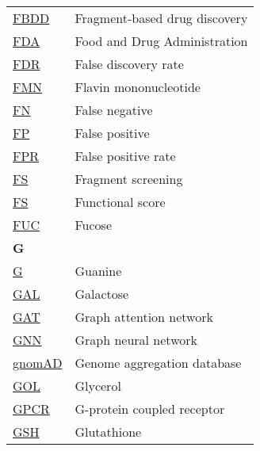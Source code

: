 \begin{longtable}[l]{@{}p{2.5cm}p{12cm}@{}}
\textmd{\href{https://en.wikipedia.org/wiki/Fragment-based_lead_discovery}{FBDD}} & Fragment-based drug discovery \\
\textmd{\href{https://en.wikipedia.org/wiki/Food_and_Drug_Administration}{FDA}} & Food and Drug Administration \\
\textmd{\href{https://en.wikipedia.org/wiki/False_discovery_rate}{FDR}} & False discovery rate \\
\textmd{\href{https://www.ebi.ac.uk/pdbe-srv/pdbechem/chemicalCompound/show/FMN}{FMN}} & Flavin mononucleotide \\
\textmd{\href{https://en.wikipedia.org/wiki/False_positives_and_false_negatives}{FN}} & False negative \\
\textmd{\href{https://en.wikipedia.org/wiki/False_positives_and_false_negatives}{FP}} & False positive \\
\textmd{\href{https://en.wikipedia.org/wiki/False_positive_rate}{FPR}} & False positive rate \\
\textmd{\href{https://en.wikipedia.org/wiki/Fragment-based_lead_discovery}{FS}} & Fragment screening \\
\textmd{\href{https://www.compbio.dundee.ac.uk/ligysis/help}{FS}} & Functional score \\
\textmd{\href{https://www.ebi.ac.uk/pdbe-srv/pdbechem/chemicalCompound/show/FUC}{FUC}} & Fucose \\[0.3175cm]
\textbf{\large G} & \\[0.25cm]
\textmd{\href{https://en.wikipedia.org/wiki/Guanine}{G}} & Guanine \\
\textmd{\href{https://www.ebi.ac.uk/pdbe-srv/pdbechem/chemicalCompound/show/GAL}{GAL}} & Galactose \\
\textmd{\href{https://en.wikipedia.org/wiki/Graph_neural_network\#Graph_attention_network}{GAT}} & Graph attention network \\
\textmd{\href{https://en.wikipedia.org/wiki/Graph_neural_network}{GNN}} & Graph neural network \\
\textmd{\href{https://gnomad.broadinstitute.org/}{gnomAD}} & Genome aggregation database \\
\textmd{\href{https://www.ebi.ac.uk/pdbe-srv/pdbechem/chemicalCompound/show/GOL}{GOL}} & Glycerol \\
\textmd{\href{https://en.wikipedia.org/wiki/G_protein-coupled_receptor}{GPCR}} & G-protein coupled receptor \\
\textmd{\href{https://www.ebi.ac.uk/pdbe-srv/pdbechem/chemicalCompound/show/GSH}{GSH}} & Glutathione \\

\end{longtable}
